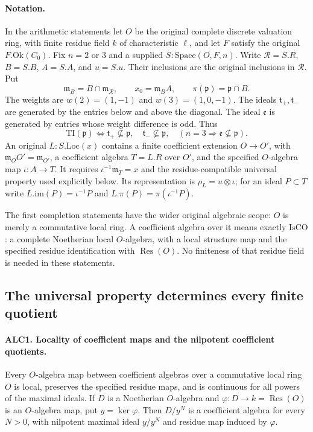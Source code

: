 \paragraph{Notation.}
In the arithmetic statements let \(O\) be the original complete
discrete valuation ring, with finite residue field \(k\) of
characteristic \(\ell\), and let \(F\) satisfy the original
\(F.\mathrm{Ok}(C_0)\).  Fix \(n=2\) or \(3\) and a supplied
\(S:\mathrm{Space}(O,F,n)\).  Write \(\mathcal R=S.R\),
\(B=S.B\), \(A=S.A\), and \(u=S.u\).  Their inclusions are
the original inclusions in \(\mathcal R\).  Put
\[
 \mathfrak m_B=B\cap\mathfrak m_{\mathcal R},\qquad
 x_0=\mathfrak m_B A,\qquad
 \pi(\mathfrak p)=\mathfrak p\cap B.
                                                        \tag{ALC.1}
\]
The weights are \(w(2)=(1,-1)\) and \(w(3)=(1,0,-1)\).
The ideals \(\mathfrak t_+,\mathfrak t_-\) are generated by the
entries below and above the diagonal.  The ideal \(\mathfrak e\)
is generated by entries whose weight difference is odd.  Thus
\[
 \mathrm{TI}(\mathfrak p)
 \Longleftrightarrow
 \mathfrak t_+\not\subseteq\mathfrak p,
 \quad\mathfrak t_-\not\subseteq\mathfrak p,
 \quad(n=3\Rightarrow\mathfrak e\not\subseteq\mathfrak p).
                                                        \tag{ALC.2}
\]
An original \(L:S.\mathrm{Loc}(x)\) contains a finite coefficient
extension \(O\to O'\), with
\(\mathfrak m_OO'=\mathfrak m_{O'}\), a coefficient algebra
\(T=L.R\) over \(O'\), and the specified \(O\)-algebra map
\(\iota:A\to T\).  It requires
\(\iota^{-1}\mathfrak m_T=x\) and the residue-compatible
universal property used explicitly below.  Its representation is
\(\rho_L=u\otimes\iota\); for an ideal \(P\subset T\) write
\(L.\mathrm{im}(P)=\iota^{-1}P\) and
\(L.\pi(P)=\pi(\iota^{-1}P)\).

The first completion statements have the wider original algebraic
scope: \(O\) is merely a commutative local ring.  A coefficient
algebra over it means exactly \(\mathrm{IsCO}\): a complete
Noetherian local \(O\)-algebra, with a local structure map and
the specified residue identification with \(\operatorname{Res}(O)\).
No finiteness of that residue field is needed in these statements.

\subsection{The universal property determines every finite quotient}

\paragraph{ALC1. Locality of coefficient maps and the nilpotent coefficient quotients.}
\label{claim:ALC1}
Every \(O\)-algebra map between coefficient algebras over a
commutative local ring \(O\) is local, preserves the specified
residue maps, and is continuous for all powers of the maximal
ideals.  If \(D\) is a Noetherian \(O\)-algebra and
\(\varphi:D\to k=\operatorname{Res}(O)\) is an
\(O\)-algebra map, put \(y=\ker\varphi\).  Then
\(D/y^N\) is a coefficient algebra for every \(N>0\), with
nilpotent maximal ideal \(y/y^N\) and residue map induced by
\(\varphi\).

